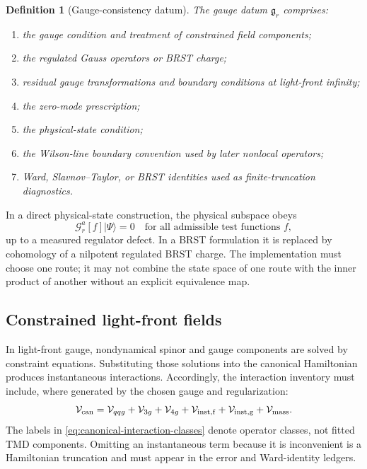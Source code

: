 \documentclass[11pt]{article}
\newtheorem{definition}{Definition}[section]
\newcommand{\cV}{\mathcal V}
\newcommand{\cG}{\mathcal G}
\begin{document}
\begin{definition}[Gauge-consistency datum]
\label{def:gauge-datum}
The gauge datum \(\mathfrak g_r\) comprises:
\begin{enumerate}
\item the gauge condition and treatment of constrained field components;
\item the regulated Gauss operators or BRST charge;
\item residual gauge transformations and boundary conditions at light-front
infinity;
\item the zero-mode prescription;
\item the physical-state condition;
\item the Wilson-line boundary convention used by later nonlocal operators;
\item Ward, Slavnov--Taylor, or BRST identities used as finite-truncation
diagnostics.
\end{enumerate}
\end{definition}

In a direct physical-state construction, the physical subspace obeys
\begin{equation}
 \cG_r^a[f]|\Psi\rangle=0
 \quad\text{for all admissible test functions }f,
\label{eq:gauss-physical-state}
\end{equation}
up to a measured regulator defect.  In a BRST formulation it is replaced by
cohomology of a nilpotent regulated BRST charge.  The implementation must
choose one route; it may not combine the state space of one route with the
inner product of another without an explicit equivalence map.

\subsection{Constrained light-front fields}

In light-front gauge, nondynamical spinor and gauge components are solved by
constraint equations.  Substituting those solutions into the canonical
Hamiltonian produces instantaneous interactions.  Accordingly, the
interaction inventory must include, where generated by the chosen gauge and
regularization:
\begin{equation}
 \cV_{\rm can}
 =\cV_{qqg}+\cV_{3g}+\cV_{4g}
 +\cV_{\rm inst,f}+\cV_{\rm inst,g}
 +\cV_{\rm mass}.
\label{eq:canonical-interaction-classes}
\end{equation}
The labels in \cref{eq:canonical-interaction-classes} denote operator
classes, not fitted TMD components.  Omitting an instantaneous term because
it is inconvenient is a Hamiltonian truncation and must appear in the error
and Ward-identity ledgers.
\end{document}
